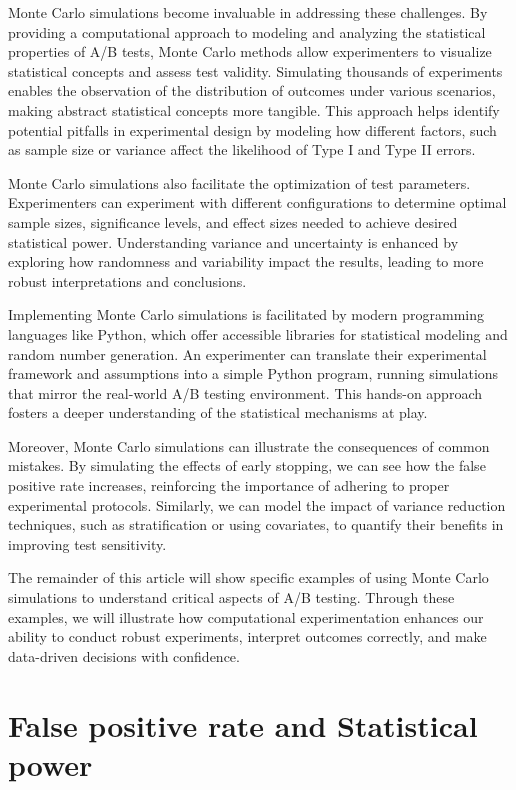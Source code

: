 \documentclass[final,5p,times,twocolumn,authoryear]{elsarticle}
\begin{document}
Monte Carlo simulations become invaluable in addressing these challenges. By providing a computational approach to modeling and analyzing the statistical properties of A/B tests, Monte Carlo methods allow experimenters to visualize statistical concepts and assess test validity. Simulating thousands of experiments enables the observation of the distribution of outcomes under various scenarios, making abstract statistical concepts more tangible. This approach helps identify potential pitfalls in experimental design by modeling how different factors, such as sample size or variance affect the likelihood of Type I and Type II errors.

Monte Carlo simulations also facilitate the optimization of test parameters. Experimenters can experiment with different configurations to determine optimal sample sizes, significance levels, and effect sizes needed to achieve desired statistical power. Understanding variance and uncertainty is enhanced by exploring how randomness and variability impact the results, leading to more robust interpretations and conclusions.

Implementing Monte Carlo simulations is facilitated by modern programming languages like Python, which offer accessible libraries for statistical modeling and random number generation. An experimenter can translate their experimental framework and assumptions into a simple Python program, running simulations that mirror the real-world A/B testing environment. This hands-on approach fosters a deeper understanding of the statistical mechanisms at play.

Moreover, Monte Carlo simulations can illustrate the consequences of common mistakes. By simulating the effects of early stopping, we can see how the false positive rate increases, reinforcing the importance of adhering to proper experimental protocols. Similarly, we can model the impact of variance reduction techniques, such as stratification or using covariates, to quantify their benefits in improving test sensitivity.

The remainder of this article will show specific examples of using Monte Carlo simulations to understand critical aspects of A/B testing. Through these examples, we will illustrate how computational experimentation enhances our ability to conduct robust experiments, interpret outcomes correctly, and make data-driven decisions with confidence.

\section{False positive rate and Statistical power}
\end{document}
